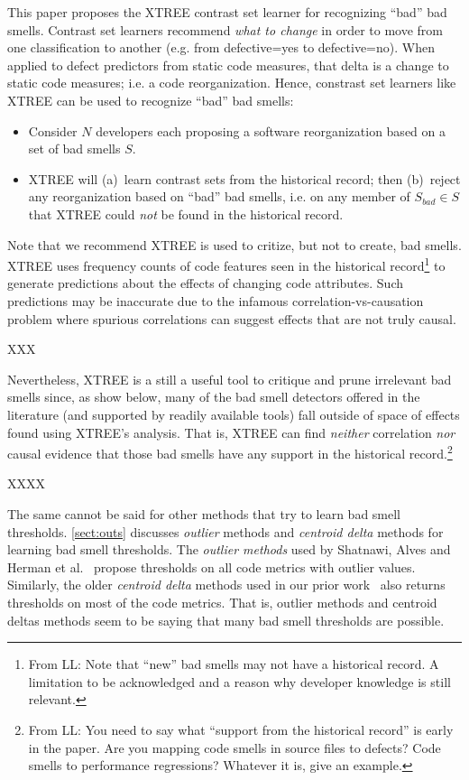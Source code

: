 \documentclass{sig-alternate}
\newcommand{\tion}[1]{\textsection\ref{sect:#1}}
\begin{document}
This paper proposes the XTREE contrast set learner for recognizing
``bad'' bad smells. 
Contrast set learners   recommend {\em what to change} in order to move from
     one classification to another (e.g. from defective=yes to
     defective=no).
     When applied to defect predictors from static code measures,
that delta is a change to static code measures;
i.e. a code reorganization. Hence, constrast set learners
like XTREE can be used to  recognize ``bad''
bad smells:
\begin{itemize}
    \item Consider $N$ developers each proposing a software reorganization 
based on a set of bad smells $S$.
\item XTREE will (a)~learn contrast sets
from the historical record; then (b)~reject  any reorganization based on ``bad'' bad smells, i.e.
 on any member of $S_{\mathit{bad}} \in S$
that XTREE could {\em not} be found in the historical record.
\end{itemize}
Note that we    recommend  XTREE  is used to critize, but  not to create,
bad smells. 
XTREE uses frequency counts of code features seen in the historical record\footnote{From LL: Note that ``new'' bad smells may not have a historical record. A limitation to be acknowledged and a reason why developer knowledge is still relevant.}
to generate
predictions about the effects of changing code
attributes. Such predictions may be inaccurate due to the infamous correlation-vs-causation problem
where spurious correlations can suggest effects that are not
truly causal.

XXX


Nevertheless, XTREE is a still a useful tool to critique and prune
irrelevant bad smells since, 
as show below, many of the bad smell detectors offered
in the literature (and supported by readily available tools)
fall outside of  space of
effects found  using XTREE's analysis.
That is,   XTREE can find 
{\em neither} correlation {\em nor}
causal evidence that those bad smells
have any support   in the historical record.\footnote{From LL: You need to say what ``support from the historical record'' is early in the paper. Are you mapping code smells in source files to defects? Code smells to performance regressions? Whatever it is, give an example.} 

XXXX

The same cannot be said for other methods that try to learn
bad smell thresholds. \tion{outs}
discusses {\em outlier} methods and {\em centroid delta} methods
for learning bad smell thresholds.
The {\em  outlier methods}  used by
Shatnawi, Alves and Herman et al.~\cite{Shatnawi10,Alves2010,hermans15}
propose thresholds on all code metrics with outlier values.
Similarly, the older {\em centroid delta} methods  used in our 
prior work~\cite{me12c} also returns thresholds on most of the code
metrics. That is, outlier methods and centroid deltas methods
seem to be saying that many bad smell thresholds are possible.
\end{document}
